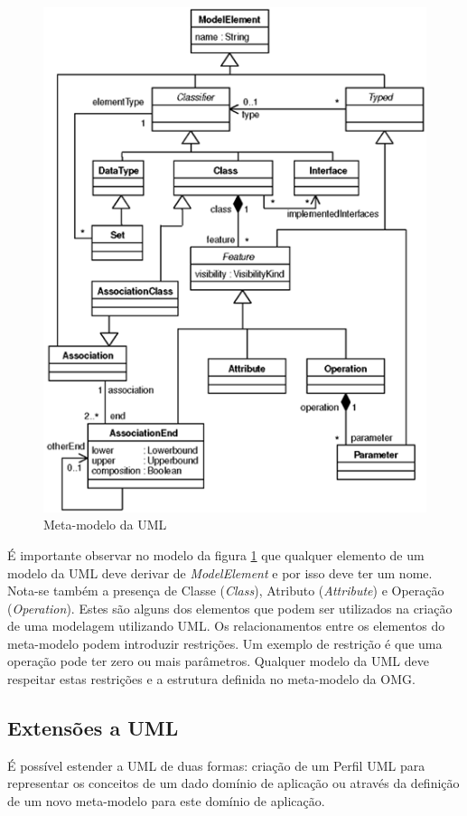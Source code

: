 \begin{figure}
	\centering
	\includegraphics{img/uml_meta_model.png}
	\caption{Meta-modelo da UML}\label{fig:uml_meta_model}
\end{figure}

É importante observar no modelo da figura \ref{fig:uml_meta_model} que qualquer elemento de um modelo da UML deve derivar de \textit{ModelElement} e
por isso deve ter um nome. Nota-se também a presença de Classe (\textit{Class}), Atributo
(\textit{Attribute}) e Operação (\textit{Operation}). Estes são alguns dos
elementos que podem ser utilizados na criação de uma modelagem utilizando UML.
Os relacionamentos entre os elementos do meta-modelo podem introduzir
restrições. Um exemplo de restrição é que uma operação pode ter zero ou mais
parâmetros. Qualquer modelo da UML deve respeitar estas restrições e a estrutura
definida no meta-modelo da OMG.

\subsection{Extensões a UML}

É possível estender a UML de duas formas: criação de um Perfil UML para representar os conceitos de um dado domínio de aplicação ou através da
definição de um novo meta-modelo para este domínio de aplicação.

